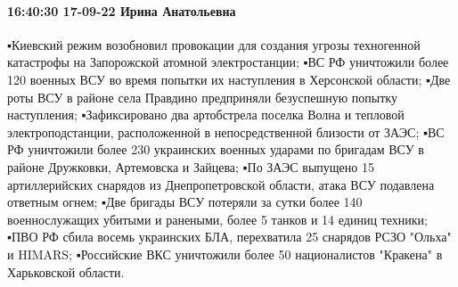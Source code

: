 \paragraph{16:40:30 17-09-22 Ирина Анатольевна}

▪️Киевский режим возобновил провокации для создания угрозы техногенной катастрофы на Запорожской атомной электростанции;
▪️ВС РФ уничтожили более 120 военных ВСУ во время попытки их наступления в Херсонской области;
▪️Две роты ВСУ в районе села Правдино предприняли безуспешную попытку наступления;
▪️Зафиксировано два артобстрела поселка Волна и тепловой электроподстанции, расположенной в непосредственной близости от ЗАЭС;
▪️ВС РФ уничтожили более 230 украинских военных ударами по бригадам ВСУ в районе Дружковки, Артемовска и Зайцева;
▪️По ЗАЭС выпущено 15 артиллерийских снарядов из Днепропетровской области, атака ВСУ подавлена ответным огнем;
▪️Две бригады ВСУ потеряли за сутки более 140 военнослужащих убитыми и ранеными, более 5 танков и 14 единиц техники;
▪️ПВО РФ сбила восемь украинских БЛА, перехватила 25 снарядов РСЗО "Ольха" и HIMARS;
▪️Российские ВКС уничтожили более 50 националистов "Кракена" в Харьковской области.
